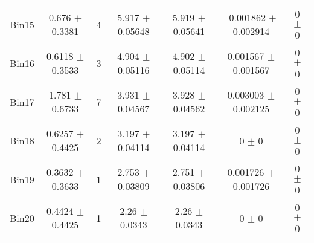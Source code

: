 \begin{tabular}{@{\extracolsep{4pt}}lcccccc@{}}
     Bin15 & 0.676 $\pm$ 0.3381 & 4 & 5.917 $\pm$ 0.05648 & 5.919 $\pm$ 0.05641 & -0.001862 $\pm$ 0.002914 & 0 $\pm$ 0 \\ 
     Bin16 & 0.6118 $\pm$ 0.3533 & 3 & 4.904 $\pm$ 0.05116 & 4.902 $\pm$ 0.05114 & 0.001567 $\pm$ 0.001567 & 0 $\pm$ 0 \\ 
     Bin17 & 1.781 $\pm$ 0.6733 & 7 & 3.931 $\pm$ 0.04567 & 3.928 $\pm$ 0.04562 & 0.003003 $\pm$ 0.002125 & 0 $\pm$ 0 \\ 
     Bin18 & 0.6257 $\pm$ 0.4425 & 2 & 3.197 $\pm$ 0.04114 & 3.197 $\pm$ 0.04114 & 0 $\pm$ 0 & 0 $\pm$ 0 \\ 
     Bin19 & 0.3632 $\pm$ 0.3633 & 1 & 2.753 $\pm$ 0.03809 & 2.751 $\pm$ 0.03806 & 0.001726 $\pm$ 0.001726 & 0 $\pm$ 0 \\ 
     Bin20 & 0.4424 $\pm$ 0.4425 & 1 & 2.26 $\pm$ 0.0343 & 2.26 $\pm$ 0.0343 & 0 $\pm$ 0 & 0 $\pm$ 0 \\ 
\hline\hline
  \end{tabular}

